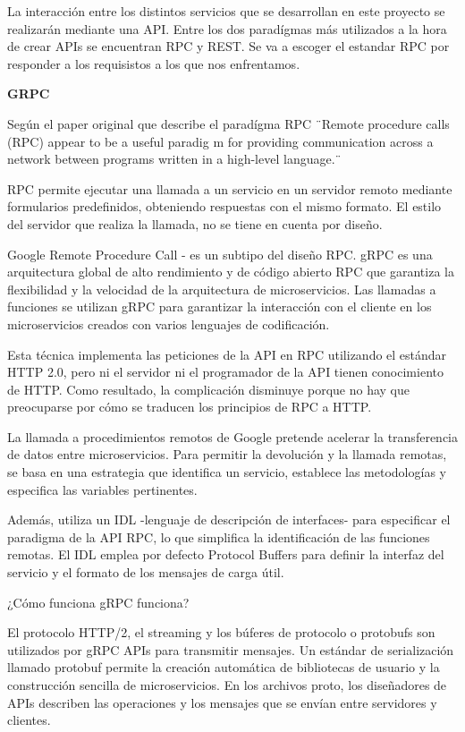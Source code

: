 
La interacción entre los distintos servicios que se desarrollan en este proyecto se realizarán mediante una API. Entre los dos paradígmas más utilizados a la hora de crear APIs se encuentran RPC y REST. Se va a escoger el estandar RPC por responder a los requisistos a los que nos enfrentamos.

\textbf{GRPC}

Según el paper original que describe el paradígma RPC ¨Remote procedure calls (RPC) appear to be a useful paradig m for providing communication across a
network between programs written in a high-level language.¨ \cite{Birrell198439}

RPC permite ejecutar una llamada a un servicio en un servidor remoto mediante formularios predefinidos, obteniendo respuestas con el mismo formato. El estilo del servidor que realiza la llamada, no se tiene en cuenta por diseño.

Google Remote Procedure Call\cite{grpc} - es un subtipo del diseño RPC. gRPC es una arquitectura global de alto rendimiento y de código abierto RPC que garantiza la flexibilidad y la velocidad de la arquitectura de microservicios. Las llamadas a funciones se utilizan gRPC para garantizar la interacción con el cliente en los microservicios creados con varios lenguajes de codificación.

Esta técnica implementa las peticiones de la API en RPC utilizando el estándar HTTP 2.0, pero ni el servidor ni el programador de la API tienen conocimiento de HTTP. Como resultado, la complicación disminuye porque no hay que preocuparse por cómo se traducen los principios de RPC a HTTP.

La llamada a procedimientos remotos de Google pretende acelerar la transferencia de datos entre microservicios. Para permitir la devolución y la llamada remotas, se basa en una estrategia que identifica un servicio, establece las metodologías y especifica las variables pertinentes.

Además, utiliza un IDL -lenguaje de descripción de interfaces- para especificar el paradigma de la API RPC, lo que simplifica la identificación de las funciones remotas. El IDL emplea por defecto Protocol Buffers para definir la interfaz del servicio y el formato de los mensajes de carga útil.

¿Cómo funciona gRPC funciona?

El protocolo HTTP/2, el streaming y los búferes de protocolo o protobufs son utilizados por gRPC APIs para transmitir mensajes. Un estándar de serialización llamado protobuf permite la creación automática de bibliotecas de usuario y la construcción sencilla de microservicios. En los archivos proto, los diseñadores de APIs describen las operaciones y los mensajes que se envían entre servidores y clientes.

